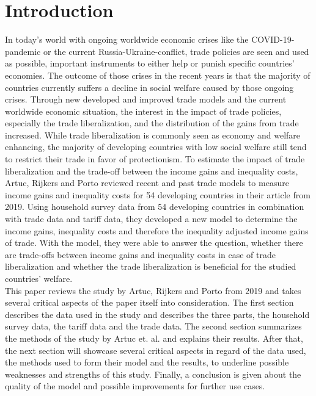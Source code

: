 \chapter{Introduction}
In today's world with ongoing worldwide economic crises like the COVID-19-pandemic or the current Russia-Ukraine-conflict,
trade policies are seen and used as possible, important instruments to either help or punish specific countries' economies. 
The outcome of those crises in the recent years is that the majority of countries currently suffers a decline in social welfare caused by those ongoing crises. Through new 
developed and improved trade models and the current worldwide economic situation, the interest in the impact of trade policies,
especially the trade liberalization, and the distribution of the gains from trade increased. 
While trade liberalization is commonly seen as economy and welfare enhancing, the majority of developing countries with low social welfare
still tend to restrict their trade in favor of protectionism. To estimate the impact of trade liberalization and the trade-off
between the income gains and inequality costs, Artuc, Rijkers and Porto reviewed recent and past trade models to measure 
income gains and inequality costs for 54 developing countries in their article from 2019. Using household survey data from 54
developing countries in combination with trade data and tariff data, they developed a new model to determine the income gains,
inequality costs and therefore the inequality adjusted income gains of trade. With the model, they were able to answer the
question, whether there are trade-offs between income gains and inequality costs in case of trade liberalization and whether
the trade liberalization is beneficial for the studied countries' welfare.\\

This paper reviews the study by Artuc, Rijkers and Porto from 2019 and takes several critical aspects of the paper itself into consideration.
The first section describes the data used in the study and describes the three parts, the household survey data, the tariff data
and the trade data. The second section summarizes the methods of the study by Artuc et. al. and explains their results.
After that, the next section will showcase several critical aspects in regard of the data used, 
the methods used to form their model and the results, to underline possible weaknesses and strengths of this study. 
Finally, a conclusion is given about the quality of the model and possible improvements for further use cases. 